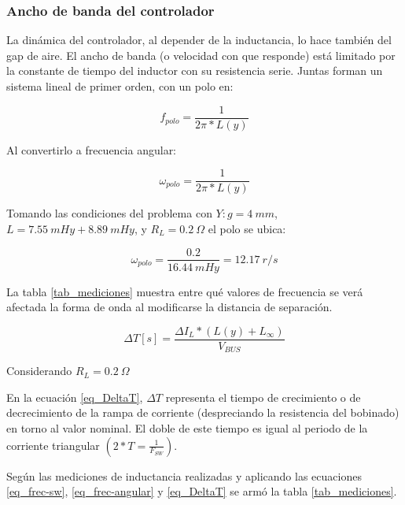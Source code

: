 \subsubsection{Ancho de banda del controlador}

\noindent La dinámica del controlador, al depender de la inductancia, lo hace también del gap de aire. El ancho de banda (o velocidad con que responde) está limitado por la constante de tiempo del inductor con su resistencia serie. Juntas forman un sistema lineal de primer orden, con un polo en:

\begin{equation} 
	f_{polo} = \frac{1}{2\pi * L(y)}
\end{equation}

\noindent Al convertirlo a frecuencia angular:

\begin{equation} \label{eq_frec-angular}
	\omega _{polo} = \frac{1}{2\pi * L(y)}
\end{equation}

\noindent Tomando las condiciones del problema con $Y:g = 4\:mm$, $L = 7.55 \:mHy + 8.89 \:mHy$, y $R_L=0.2\:\Omega$ el polo se ubica:

\begin{equation} 
	\omega _{polo} = \frac{0.2}{16.44 \:mHy} = 12.17 \:r/s
\end{equation}

\noindent La tabla \ref{tab_mediciones} muestra  entre qué valores de frecuencia se verá afectada la forma de onda al modificarse la distancia de separación.

\begin{equation} \label{eq_DeltaT}
	\Delta T [s] = \frac{\Delta I_L * (L(y) + L_{\infty})}{V_{BUS}}
\end{equation}


\noindent Considerando $R_L=0.2 \:\Omega$ 

\noindent En la ecuación \ref{eq_DeltaT}, $\Delta T$ representa el tiempo de crecimiento o de decrecimiento de la rampa de corriente (despreciando la resistencia del bobinado) en torno al valor nominal. El doble de este tiempo es igual al periodo de la corriente triangular $(2*T=\frac{1}{F_{SW}})$.

\noindent Según las mediciones de inductancia realizadas y aplicando las ecuaciones \ref{eq_frec-sw}, \ref{eq_frec-angular} y \ref{eq_DeltaT} se armó la tabla \ref{tab_mediciones}.


